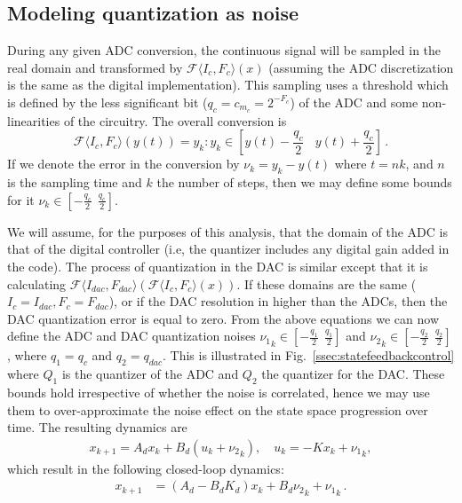 \documentclass[twocolumn]{autart}    %
\begin{document}
\subsection{Modeling quantization as noise} \label{appendix:quantization-noise}

During any given ADC conversion, the continuous signal will be sampled in
the real domain and transformed by $\mathcal{F}\langle I_{c},F_{c} \rangle
(x)$ (assuming the ADC discretization is the same as the digital
implementation).  This sampling uses a threshold which is defined by the
less significant bit ($q_{c}=c_{m_c}=2^{-F_c}$) 
of the ADC and some non-linearities of the circuitry.  The overall conversion is
%
$$\mathcal{F}\langle I_{c},F_{c} \rangle(y(t)) = y_k :
y_k \in \left[y(t)-\frac{q_{c}}{2}\ \ \ \ y(t)+\frac{q_{c}}{2}\right] \,.$$
%
If we denote the error in the conversion by $\nu_k=y_k-y(t)$ where $t = nk$,
and $n$ is the sampling time and $k$ the number of steps, then we may define
some bounds for it $\nu_k \in [-\frac{q_{c}}{2}\ \ \frac{q_{c}}{2}]$.

We will assume, for the purposes of this analysis, that the domain of the
ADC is that of the digital controller (i.e, the quantizer includes any
digital gain added in the code).  The process of quantization in the DAC is
similar except that it is calculating $\mathcal{F}\langle I_{dac},F_{dac}
\rangle (\mathcal{F}\langle I_{c},F_{c} \rangle (x)) $.  If these domains
are the same ($I_{c}=I_{dac},\allowbreak F_{c}=F_{dac}$), or if the DAC
resolution in higher than the ADCs, then the DAC quantization error is equal
to zero.  From the above equations we can now define the ADC and DAC
quantization noises ${\nu_1}_k \in [-\frac{q_1}{2}\ \ \frac{q_1}{2}]$ and
${\nu_2}_k \in [-\frac{q_2}{2}\ \ \frac{q_2}{2}]$, where $q_1=q_{c}$ and 
$q_2=q_\mathit{dac}$.  This is illustrated in
Fig.~\ref{ssec:statefeedbackcontrol} where $Q_1$ is the quantizer of the ADC
and $Q_2$ the quantizer for the DAC.  These bounds hold irrespective of
whether the noise is correlated, hence we may use them to over-approximate
the noise effect on the state space progression over time.  The
resulting dynamics are
%
\begin{align*}
{x}_{k+1} = {A}_d{x}_k+{B}_d({u}_k+{{\nu}_2}_k), \quad u_k = -K{x}_{k}+{{\nu}_1}_k, 
\end{align*}
%
which result in the following closed-loop dynamics:
%
\begin{align*}
{x}_{k+1} &= ({A}_d-{B}_d{K}_d) {x}_k+{B}_d{{\nu}_2}_k +{{\nu}_1}_k \,. 
\end{align*}



\end{document}
